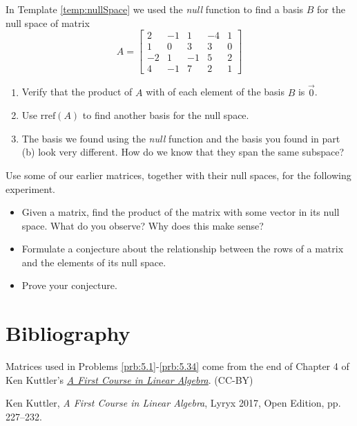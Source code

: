 \documentclass{ximera}
\begin{document}

\begin{problem}\label{prob_oct_Rn1}
    In Template \ref{temp:nullSpace} we used the \emph{null} function to find a basis $B$ for the null space of matrix $$A=\begin{bmatrix}2&-1&1&-4&1\\1&0&3&3&0\\-2&1&-1&5&2\\4&-1&7&2&1\end{bmatrix}$$ 

    \begin{enumerate}
        \item Verify that the product of $A$ with of each element of the basis $B$ is $\vec{0}$.
        \item Use $\text{rref}(A)$ to find another basis for the null space.  
        \item The basis we found using the \emph{null} function and the basis you found in part (b) look very different.  How do we know that they span the same subspace?
    \end{enumerate}
\end{problem}

\begin{problem}\label{prob_oct_Rn2}
    Use some of our earlier matrices, together with their null spaces, for the following experiment.
    \begin{itemize}
        \item Given a matrix, find the product of the matrix with some vector in its null space.  What do you observe?  Why does this make sense?
        \item Formulate a conjecture about the relationship between the rows of a matrix and the elements of its null space.
        \item Prove your conjecture.
    \end{itemize}
\end{problem}

\section*{Bibliography}
Matrices used in Problems \ref{prb:5.1}-\ref{prb:5.34} come from the end of Chapter 4 of Ken Kuttler's \href{https://open.umn.edu/opentextbooks/textbooks/a-first-course-in-linear-algebra-2017}{\it A First Course in Linear Algebra}. (CC-BY)

Ken Kuttler, {\it  A First Course in Linear Algebra}, Lyryx 2017, Open Edition, pp. 227--232.  
\end{document}
